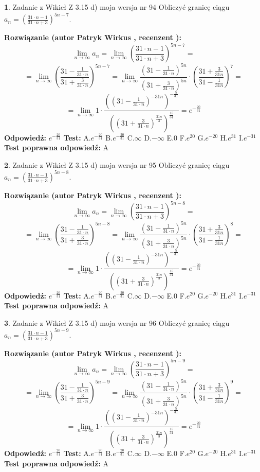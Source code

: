 \documentclass[12pt, a4paper]{article}
\theoremstyle{definition} %
\newtheorem{zad}{}
\newcommand{\zadStart}[1]{\begin{zad}#1\newline}
\newcommand{\zadStop}{\end{zad}}
\newcommand{\rozwStart}[2]{\noindent \textbf{Rozwiązanie (autor #1 , recenzent #2): }\newline}
\newcommand{\rozwStop}{\newline}
\newcommand{\odpStart}{\noindent \textbf{Odpowiedź:}\newline}
\newcommand{\odpStop}{\newline}
\newcommand{\testStart}{\noindent \textbf{Test:}\newline}
\newcommand{\testStop}{\newline}
\newcommand{\kluczStart}{\noindent \textbf{Test poprawna odpowiedź:}\newline}
\newcommand{\kluczStop}{\newline}
\begin{document}
\zadStart{Zadanie z Wikieł Z 3.15 d) moja wersja nr 94}
Obliczyć granicę ciągu $a_{n}=(\frac{31\cdot n - 1}{31 \cdot n + 3})^{5n-7}$.
\zadStop
\rozwStart{Patryk Wirkus}{}
$$\lim\limits_{n\to\infty} a_{n} = \lim\limits_{n\to\infty}(\frac{31\cdot n - 1}{31 \cdot n + 3})^{5n-7}=$$
$$=\lim\limits_{n\to\infty}(\frac{31 - \frac{1}{31\cdot n}}{31 + \frac{3}{31 \cdot n}})^{5n-7}=\lim\limits_{n\to\infty}\frac{(31 - \frac{1}{31\cdot n})^{5n}}{(31 + \frac{3}{31\cdot n})^{5n}} \cdot (\frac{31+\frac{3}{31n}}{31-\frac{1}{31n}})^{7}=$$
$$=\lim\limits_{n\to\infty} 1 \cdot \frac{((31-\frac{1}{31 \cdot n})^{-31n})^{-\frac{5}{31}}}{((31+\frac{3}{31 \cdot n})^{\frac{31n}{3}})^{\frac{15}{31}}} =e^{-\frac{20}{31}}$$
\rozwStop
\odpStart
$e^{-\frac{20}{31}}$
\odpStop
\testStart
A.$ e^{-\frac{20}{31}}$
B.$ e^{-\frac{20}{31}}$
C.$\infty$
D.$-\infty$
E.$0$
F.$e^{20}$
G.$e^{-20}$
H.$e^{31}$
I.$e^{-31}$
\testStop
\kluczStart
A
\kluczStop



\zadStart{Zadanie z Wikieł Z 3.15 d) moja wersja nr 95}
Obliczyć granicę ciągu $a_{n}=(\frac{31\cdot n - 1}{31 \cdot n + 3})^{5n-8}$.
\zadStop
\rozwStart{Patryk Wirkus}{}
$$\lim\limits_{n\to\infty} a_{n} = \lim\limits_{n\to\infty}(\frac{31\cdot n - 1}{31 \cdot n + 3})^{5n-8}=$$
$$=\lim\limits_{n\to\infty}(\frac{31 - \frac{1}{31\cdot n}}{31 + \frac{3}{31 \cdot n}})^{5n-8}=\lim\limits_{n\to\infty}\frac{(31 - \frac{1}{31\cdot n})^{5n}}{(31 + \frac{3}{31\cdot n})^{5n}} \cdot (\frac{31+\frac{3}{31n}}{31-\frac{1}{31n}})^{8}=$$
$$=\lim\limits_{n\to\infty} 1 \cdot \frac{((31-\frac{1}{31 \cdot n})^{-31n})^{-\frac{5}{31}}}{((31+\frac{3}{31 \cdot n})^{\frac{31n}{3}})^{\frac{15}{31}}} =e^{-\frac{20}{31}}$$
\rozwStop
\odpStart
$e^{-\frac{20}{31}}$
\odpStop
\testStart
A.$ e^{-\frac{20}{31}}$
B.$ e^{-\frac{20}{31}}$
C.$\infty$
D.$-\infty$
E.$0$
F.$e^{20}$
G.$e^{-20}$
H.$e^{31}$
I.$e^{-31}$
\testStop
\kluczStart
A
\kluczStop



\zadStart{Zadanie z Wikieł Z 3.15 d) moja wersja nr 96}
Obliczyć granicę ciągu $a_{n}=(\frac{31\cdot n - 1}{31 \cdot n + 3})^{5n-9}$.
\zadStop
\rozwStart{Patryk Wirkus}{}
$$\lim\limits_{n\to\infty} a_{n} = \lim\limits_{n\to\infty}(\frac{31\cdot n - 1}{31 \cdot n + 3})^{5n-9}=$$
$$=\lim\limits_{n\to\infty}(\frac{31 - \frac{1}{31\cdot n}}{31 + \frac{3}{31 \cdot n}})^{5n-9}=\lim\limits_{n\to\infty}\frac{(31 - \frac{1}{31\cdot n})^{5n}}{(31 + \frac{3}{31\cdot n})^{5n}} \cdot (\frac{31+\frac{3}{31n}}{31-\frac{1}{31n}})^{9}=$$
$$=\lim\limits_{n\to\infty} 1 \cdot \frac{((31-\frac{1}{31 \cdot n})^{-31n})^{-\frac{5}{31}}}{((31+\frac{3}{31 \cdot n})^{\frac{31n}{3}})^{\frac{15}{31}}} =e^{-\frac{20}{31}}$$
\rozwStop
\odpStart
$e^{-\frac{20}{31}}$
\odpStop
\testStart
A.$ e^{-\frac{20}{31}}$
B.$ e^{-\frac{20}{31}}$
C.$\infty$
D.$-\infty$
E.$0$
F.$e^{20}$
G.$e^{-20}$
H.$e^{31}$
I.$e^{-31}$
\testStop
\kluczStart
A
\kluczStop
\end{document}
